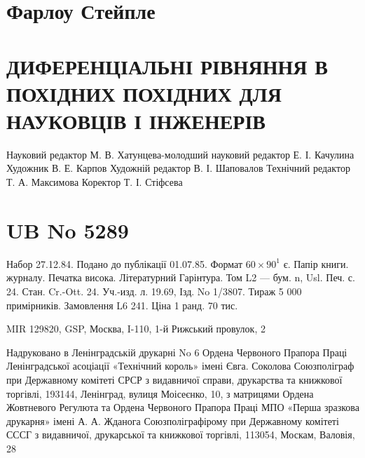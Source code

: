 \documentclass[
  ukrainian,
]{article}
\begin{document}
\section{Фарлоу
Стейпле}\label{ux444ux430ux440ux43bux43eux443-ux441ux442ux435ux439ux43fux43bux435}

\section{ДИФЕРЕНЦІАЛЬНІ РІВНЯННЯ В ПОХІДНИХ ПОХІДНИХ ДЛЯ НАУКОВЦІВ І
ІНЖЕНЕРІВ}\label{ux434ux438ux444ux435ux440ux435ux43dux446ux456ux430ux43bux44cux43dux456-ux440ux456ux432ux43dux44fux43dux43dux44f-ux432-ux43fux43eux445ux456ux434ux43dux438ux445-ux43fux43eux445ux456ux434ux43dux438ux445-ux434ux43bux44f-ux43dux430ux443ux43aux43eux432ux446ux456ux432-ux456-ux456ux43dux436ux435ux43dux435ux440ux456ux432}

Науковий редактор М. В. Хатунцева-молодший науковий редактор Е. І.
Качулина Художник В. Е. Карпов Художній редактор В. І. Шаповалов
Технічний редактор Т. А. Максимова Коректор Т. І. Стіфсева

\section{UB No 5289}\label{ub-no-5289}

Набор 27.12.84. Подано до публікації 01.07.85. Формат \(60\times90^{1}\)
є. Папір книги. журналу. Печатка висока. Літературний Гарінтура. Том L2
--- бум. n, Usl. Печ. с. 24. Стан. Cr.-Ott. 24. Уч.-изд. л. 19.69, Ізд.
No 1/3807. Тираж 5 000 примірників. Замовлення L6 241. Ціна 1 ранд. 70
тис.

MIR 129820, GSP, Москва, I-110, 1-й Рижський провулок, 2

Надруковано в Ленінградській друкарні No 6 Ордена Червоного Прапора
Праці Ленінградської асоціації «Технічний король» імені Євга. Соколова
Союзполіграф при Державному комітеті СРСР з видавничої справи,
друкарства та книжкової торгівлі, 193144, Ленінград, вулиця Моісеєнко,
10, з матрицями Ордена Жовтневого Регулюта та Ордена Червоного Прапора
Праці МПО «Перша зразкова друкарня» імені А. А. Жданога
Союзполіграфірому при Державному комітеті СССГ з видавничої, друкарської
та книжкової торгівлі, 113054, Москам, Валовія, 28
\end{document}
